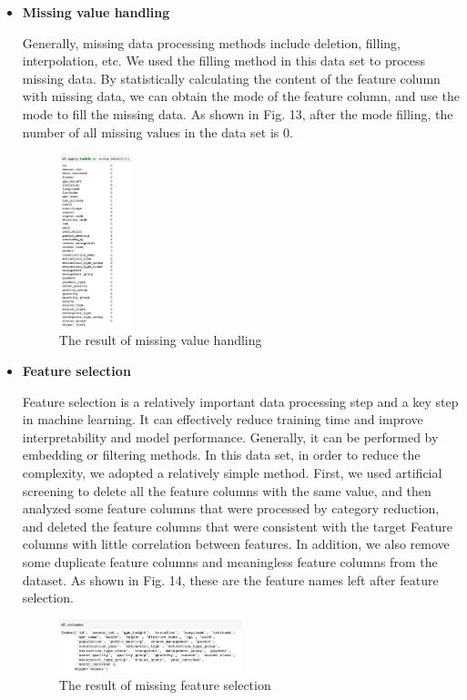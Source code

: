 \documentclass[conference]{IEEEtran}
\begin{document}
\begin{itemize}
\item \textbf{Missing value handling}

Generally, missing data processing methods include deletion, filling, interpolation, etc. We used the filling method in this data set to process missing data. By statistically calculating the content of the feature column with missing data, we can obtain the mode of the feature column, and use the mode to fill the missing data. As shown in Fig. 13, after the mode filling, the number of all missing values in the data set is 0.

\begin{figure}[H]
\centerline{\includegraphics[width=0.2\textwidth]{12.pic.jpg}}
\caption{The result of missing value handling}
\end{figure}
    

\item \textbf{Feature selection}

Feature selection is a relatively important data processing step and a key step in machine learning. It can effectively reduce training time and improve interpretability and model performance. Generally, it can be performed by embedding or filtering methods. In this data set, in order to reduce the complexity, we adopted a relatively simple method. First, we used artificial screening to delete all the feature columns with the same value, and then analyzed some feature columns that were processed by category reduction, and deleted the feature columns that were consistent with the target Feature columns with little correlation between features. In addition, we also remove some duplicate feature columns and meaningless feature columns from the dataset. As shown in Fig. 14, these are the feature names left after feature selection.

\begin{figure}[H]
\centerline{\includegraphics[width=0.5\textwidth]{13.pic.jpg}}
\caption{The result of missing feature selection}
\end{figure}
    

\end{itemize}
\end{document}
